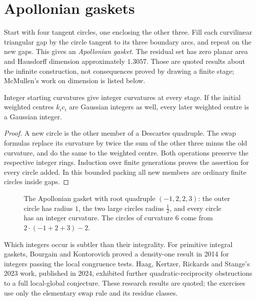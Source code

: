 \section{Apollonian gaskets}

Start with four tangent circles, one enclosing the other three. Fill each curvilinear triangular gap by the circle tangent to its three boundary arcs, and repeat on the new gaps. This gives an \emph{Apollonian gasket}. The residual set has zero planar area and Hausdorff dimension approximately $1.3057$. Those are quoted results about the infinite construction, not consequences proved by drawing a finite stage; McMullen's work on dimension is listed below.

\begin{corollary}\label{geometry:cor:integral}
Integer starting curvatures give integer curvatures at every stage. If the initial weighted centres $k_ic_i$ are Gaussian integers as well, every later weighted centre is a Gaussian integer.
\end{corollary}
\begin{proof}
A new circle is the other member of a Descartes quadruple. The swap formulas replace its curvature by twice the sum of the other three minus the old curvature, and do the same to the weighted centre. Both operations preserve the respective integer rings. Induction over finite generations proves the assertion for every circle added. In this bounded packing all new members are ordinary finite circles inside gaps.
\end{proof}

\begin{figure}[ht]
\centering
{}
\caption{The Apollonian gasket with root quadruple $(-1,2,2,3)$: the outer circle has radius $1$, the two large circles radius $\frac12$, and every
circle has an integer curvature. The circles of curvature $6$ come from $2\cdot(-1+2+3)-2$.}
\label{geometry:fig:gasket}
\end{figure}
\FloatBarrier

Which integers occur is subtler than their integrality. For primitive integral gaskets, Bourgain and Kontorovich proved a density-one result in 2014 for integers passing the local congruence tests. Haag, Kertzer, Rickards and Stange's 2023 work, published in 2024, exhibited further quadratic-reciprocity obstructions to a full local-global conjecture. These research results are quoted; the exercises use only the elementary swap rule and its residue classes.

